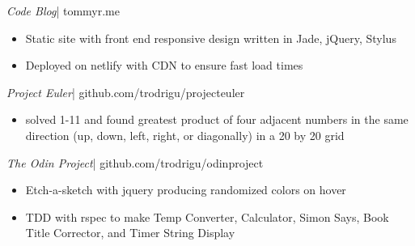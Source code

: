 \documentclass[margin]{res}
\begin{document}
\begin{resume}
  {\sl Code Blog}| 
  tommyr.me
  \begin{itemize}
      \item Static site with front end responsive design written in Jade, jQuery, Stylus
      \item Deployed on netlify with CDN to ensure fast load times
  \end{itemize}

  {\sl Project Euler}|
  github.com/trodrigu/projecteuler
  \begin{itemize}
    \item solved 1-11 and found greatest product of four adjacent numbers in the same direction (up, down, left, right, or diagonally) in a 20 by 20 grid
  \end{itemize}

  {\sl The Odin Project}|
  github.com/trodrigu/odinproject 
  \begin{itemize}
       \item Etch-a-sketch with jquery producing randomized colors on hover
       \item TDD with rspec to make Temp Converter, Calculator, Simon Says, Book Title Corrector, and Timer String Display
  \end{itemize} 


\end{resume}
\end{document}
